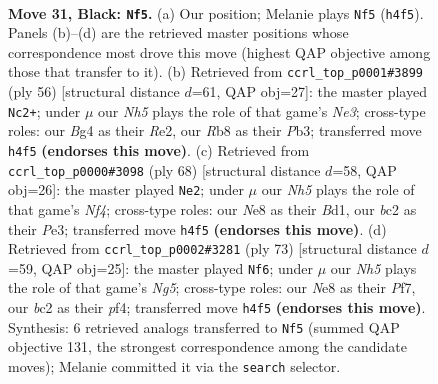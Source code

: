 \documentclass[11pt]{article}
\begin{document}
\clearpage

\begin{figure}[p]\centering
\begin{subfigure}{0.46\textwidth}\centering
\resizebox{\linewidth}{!}{%
\newchessgame
\chessboard[
  setfen={1r2n1k1/2p2p1p/p1P3p1/P3p3/6bn/6P1/2B5/RNB3K1 b - - 0 31},
  showmover=false,
  pgfstyle=straightmove, color=movearrow, markmove={h4-f5}
]}
\caption{}
\end{subfigure}\hfill
\begin{subfigure}{0.46\textwidth}\centering
\resizebox{\linewidth}{!}{%
\newchessgame
\chessboard[
  setfen={2r5/1bp3pp/p3k3/7P/Pp3p2/1P2N3/1P2RPP1/6K1 w - - 0 29},
  showmover=false,
  pgfstyle=straightmove, color=movearrow, markmove={e3-c2}
]}
\caption{}
\end{subfigure}
\\[4pt]
\begin{subfigure}{0.46\textwidth}\centering
\resizebox{\linewidth}{!}{%
\newchessgame
\chessboard[
  setfen={2b4k/2r2p2/5n1p/3p2p1/5N2/4P2P/5PP1/1R1B2K1 w - - 0 35},
  showmover=false,
  pgfstyle=straightmove, color=movearrow, markmove={f4-e2}
]}
\caption{}
\end{subfigure}\hfill
\begin{subfigure}{0.46\textwidth}\centering
\resizebox{\linewidth}{!}{%
\newchessgame
\chessboard[
  setfen={8/r4ppk/4p2p/N1R5/p3PPn1/6PP/1P2K3/8 b - - 0 37},
  showmover=false,
  pgfstyle=straightmove, color=movearrow, markmove={g4-f6}
]}
\caption{}
\end{subfigure}
\caption{\textbf{Move 31, Black: \texttt{Nf5}.} (a) Our position; Melanie plays \texttt{Nf5} (\texttt{h4f5}). Panels (b)--(d) are the retrieved master positions whose correspondence most drove this move (highest QAP objective among those that transfer to it). (b) Retrieved from \texttt{ccrl\_top\_p0001\#3899} (ply 56) [structural distance $d$=61, QAP obj=27]: the master played \texttt{Nc2+}; under $\mu$ our \emph{Nh5} plays the role of that game's \emph{Ne3}; cross-type roles: our \emph{B}g4 as their \emph{R}e2, our \emph{R}b8 as their \emph{P}b3; transferred move \texttt{h4f5} \textbf{(endorses this move)}. (c) Retrieved from \texttt{ccrl\_top\_p0000\#3098} (ply 68) [structural distance $d$=58, QAP obj=26]: the master played \texttt{Ne2}; under $\mu$ our \emph{Nh5} plays the role of that game's \emph{Nf4}; cross-type roles: our \emph{N}e8 as their \emph{B}d1, our \emph{b}c2 as their \emph{P}e3; transferred move \texttt{h4f5} \textbf{(endorses this move)}. (d) Retrieved from \texttt{ccrl\_top\_p0002\#3281} (ply 73) [structural distance $d$=59, QAP obj=25]: the master played \texttt{Nf6}; under $\mu$ our \emph{Nh5} plays the role of that game's \emph{Ng5}; cross-type roles: our \emph{N}e8 as their \emph{P}f7, our \emph{b}c2 as their \emph{p}f4; transferred move \texttt{h4f5} \textbf{(endorses this move)}. Synthesis: 6 retrieved analogs transferred to \texttt{Nf5} (summed QAP objective 131, the strongest correspondence among the candidate moves); Melanie committed it via the \texttt{search} selector.}
\label{fig:thought-m61}
\end{figure}
\end{document}
